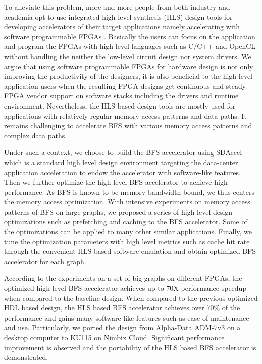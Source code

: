 To alleviate this problem, more and more people from both industry and 
academia opt to use integrated high level synthesis (HLS) design tools for 
developing accelerators of their target applications namely 
accelerating with software programmable FPGAs \cite{koch2016fpgas, xilinx-sdaccel}.
Basically the users can focus on the application and program the FPGAs with high 
level languages such as C/C++ and OpenCL without handling the neither the low-level 
circuit design nor system drivers. We argue that using software programmable FPGAs for hardware 
design is not only improving 
the productivity of the designers, it is also 
beneficial to the high-level application users when the resulting 
FPGA designs get continuous and steady FPGA vendor support on software stacks 
including the drivers and runtime environment. Nevertheless, the HLS based design tools are 
mostly used for applications with relatively regular memory access 
patterns and data paths. It remains challenging to accelerate BFS with various memory 
access patterns and complex data paths.

Under such a context, we choose to build the BFS accelerator using SDAccel 
which is a standard high level design environment targeting 
the data-center application acceleration to endow the accelerator with software-like features.
Then we further optimize the high level BFS accelerator to achieve high performance.
As BFS is known to be memory bandwidth bound, we thus centers the memory 
access optimization. With intensive experiments on memory access patterns of BFS on large graphs, 
we proposed a series of high level design optimizations such as prefetching and caching 
to the BFS accelerator. Some of the optimizations can be applied to many other similar applications. 
Finally, we tune the optimization parameters with high level metrics 
such as cache hit rate through the convenient HLS based 
software emulation and obtain optimized BFS accelerator for each graph. 

According to the experiments on a set of big graphs on different FPGAs, the optimized high level BFS 
accelerator achieves up to 70X performance speedup when compared to the baseline 
design. When compared to the previous optimized HDL based design, 
the HLS based BFS accelerator achieves over 70\% of the performance 
and gains many software-like features 
such as ease of maintenance and use. Particularly, we 
ported the design from Alpha-Data ADM-7v3 on a desktop computer to 
KU115 on Nimbix Cloud. Significant performance improvement is observed and 
the portability of the HLS based BFS accelerator is demonstrated.

